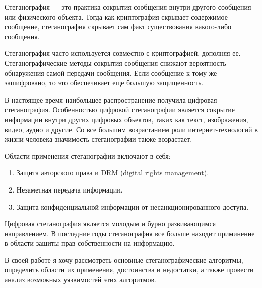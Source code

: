 \Introduction
Стеганография --- это практика сокрытия сообщения внутри другого сообщения или физического объекта.
Тогда как криптография скрывает содержимое сообщение, стеганография скрывает сам факт существования какого-либо сообщения.

Стеганография часто используется совместно с криптографией, дополняя ее.
Стеганографические методы сокрытия сообщения снижают вероятность обнаружения самой передачи сообщения.
Если сообщение к тому же зашифровано, то это обеспечивает еще большую защищенность. 

В настоящее время наибольшее распространение получила цифровая стеганография.
Особенностью цифровой стеганографии является сокрытие информации внутри других цифровых объектов,
таких как текст, изображения, видео, аудио и другие.
Со все большим возрастанием роли интернет-технологий в жизни человека значимость стеганографии также возрастает.

Области применения стеганографии включают в себя:
\begin{enumerate}
    \item Защита авторского права и DRM (digital rights management).
    \item Незаметная передача информации.
    \item Защита конфиденциальной информации от несанкционированного доступа.
\end{enumerate}

Цифровая стеганография является молодым и бурно развивающимся направлением. В последние годы
стеганография все больше находит приминение в области защиты прав собственности на информацию.

В своей работе я хочу рассмотреть основные стеганографические алгоритмы, определить области их применения,
достоинства и недостатки, а также провести анализ возможных уязвимостей этих алгоритмов.
